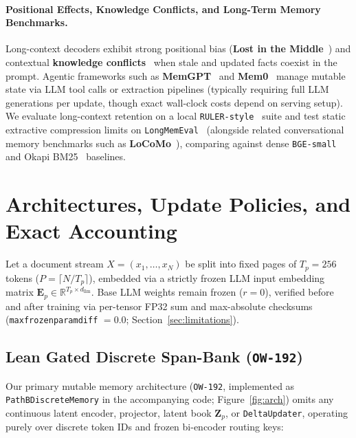 \documentclass[11pt]{article}
\newcommand{\vect}[1]{\mathbf{#1}}
\renewcommand{\_}{\origunderscore\allowbreak}
\begin{document}
\paragraph{Positional Effects, Knowledge Conflicts, and Long-Term Memory Benchmarks.}
Long-context decoders exhibit strong positional bias (\textbf{Lost in the Middle}~\cite{liu2024lost}) and contextual \textbf{knowledge conflicts}~\cite{longpre2021conflict} when stale and updated facts coexist in the prompt. Agentic frameworks such as \textbf{MemGPT}~\cite{packer2023memgpt} and \textbf{Mem0}~\cite{chhikara2025mem0} manage mutable state via LLM tool calls or extraction pipelines (typically requiring full LLM generations per update, though exact wall-clock costs depend on serving setup). We evaluate long-context retention on a local \texttt{RULER-style}~\cite{hsieh2024ruler} suite and test static extractive compression limits on \texttt{LongMemEval}~\cite{wu2025longmemeval} (alongside related conversational memory benchmarks such as \textbf{LoCoMo}~\cite{maharana2024locomo}), comparing against dense \texttt{BGE-small}~\cite{xiao2024bge} and Okapi BM25~\cite{robertson2009bm25} baselines.

\section{Architectures, Update Policies, and Exact Accounting}
\label{sec:method}

Let a document stream $X = (x_1, \dots, x_N)$ be split into fixed pages of $T_p = 256$ tokens ($P = \lceil N/T_p \rceil$), embedded via a strictly frozen LLM input embedding matrix $\vect{E}_p \in \mathbb{R}^{T_p \times d_{\text{llm}}}$. Base LLM weights remain frozen ($r=0$), verified before and after training via per-tensor FP32 sum and max-absolute checksums (\texttt{max\_frozen\_param\_diff} $= 0.0$; Section~\ref{sec:limitations}).

\subsection{Lean Gated Discrete Span-Bank (\texttt{OW-192})}
Our primary mutable memory architecture (\texttt{OW-192}, implemented as \texttt{PathBDiscreteMemory} in the accompanying code; Figure~\ref{fig:arch}) omits any continuous latent encoder, projector, latent book $\vect{Z}_p$, or \texttt{DeltaUpdater}, operating purely over discrete token IDs and frozen bi-encoder routing keys:
\end{document}
